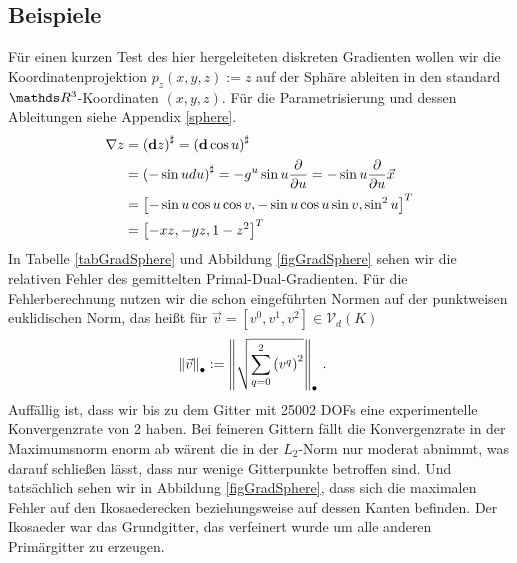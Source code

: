  \subsection{Beispiele}
    \begin{beispiel}[Sphäre]
      Für einen kurzen Test des hier hergeleiteten diskreten Gradienten wollen wir die Koordinatenprojektion
      \( p_{z}(x,y,z):= z \) auf der Sphäre ableiten in den standard \( \R^{3} \)-Koordinaten \( (x,y,z) \).
      Für die Parametrisierung und dessen Ableitungen siehe Appendix \ref{sphere}.
      \begin{align}
        \nabla z &= \left( \mathbf{d} z \right)^{\sharp} = \left( \mathbf{d} \cos u \right)^{\sharp} \\
                 &= \left( -\sin u du \right)^{\sharp} = - g^{u} \sin u \frac{\partial}{\partial u} 
                  = -\sin u \frac{\partial}{\partial u} \vec{x} \\
                  &= \left[ -\sin u \cos u \cos v ,
                           -\sin u \cos u \sin v ,
                           \sin^{2} u \right]^{T} \\
                  &= \left[ -xz, -yz, 1-z^{2} \right]^{T}
      \end{align}
      In Tabelle \ref{tabGradSphere} und Abbildung \ref{figGradSphere} sehen wir die relativen Fehler des gemittelten Primal-Dual-Gradienten.
      Für die Fehlerberechnung nutzen wir die schon eingeführten Normen auf der punktweisen euklidischen Norm, das heißt
      für \( \vec{v} = \left[ v^{0}, v^{1}, v^{2} \right] \in \mathcal{V}_{d}(K) \)
      \begin{align}
        \left\|  \vec{v} \right\|_{\bullet} &:= \left\|  \sqrt{\sum_{q=0}^{2} \left( v^{q} \right)^{2}} \right\|_{\bullet}
        \,\text{.}
      \end{align}
      Auffällig ist, dass wir bis zu dem Gitter mit 25002 DOFs eine experimentelle Konvergenzrate von 2 haben. 
      Bei feineren Gittern fällt die Konvergenzrate in der Maximumsnorm enorm ab wärent die in der \( L_{2} \)-Norm nur moderat abnimmt,
      was darauf schließen lässt, dass nur wenige Gitterpunkte betroffen sind.
      Und tatsächlich sehen wir in Abbildung \ref{figGradSphere}, dass sich die maximalen Fehler auf den Ikosaederecken
      beziehungsweise auf dessen Kanten befinden.
      Der Ikosaeder war das Grundgitter, das verfeinert wurde um alle anderen Primärgitter zu erzeugen.


\end{beispiel}
